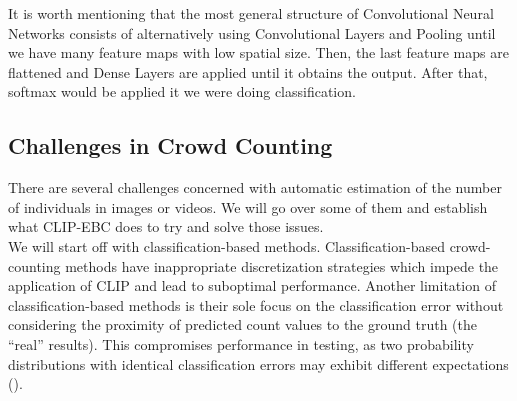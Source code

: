 It is worth mentioning that the most general structure of Convolutional Neural Networks consists of alternatively using Convolutional Layers and Pooling until we have many feature maps with low spatial size. Then, the last feature maps are flattened and Dense Layers are applied until it obtains the output. After that, softmax would be applied it we were doing classification.\\



%
%
%
%
%
%
%
%
%
%
%
%
%
%
%
%
%
%
%
%
%
%
%
%
%
%
%
%
%
%
%
%
\subsection{Challenges in Crowd Counting}
There are several challenges concerned with automatic estimation of the number of individuals in images or videos. We will go over some of them and establish what CLIP-EBC does to try and solve those issues.\\

We will start off with classification-based methods. Classification-based crowd-counting methods have inappropriate discretization strategies which impede the application of CLIP and lead to suboptimal performance. Another limitation of classification-based methods is their sole focus on the classification error without considering the proximity of predicted count values to the ground truth (the ``real'' results). This compromises performance in testing, as two probability distributions with identical classification errors may exhibit different expectations (\cite{CLIP}).\\

